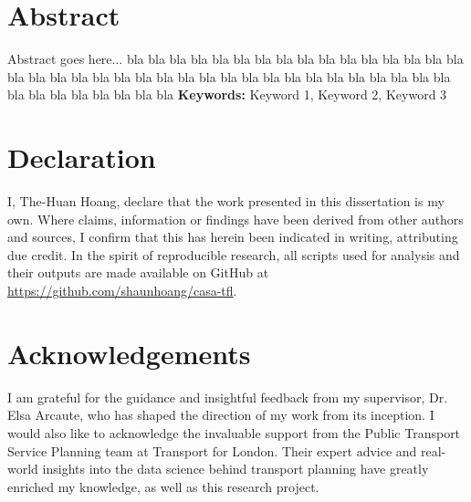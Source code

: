 \chapter*{Abstract}
Abstract goes here... bla bla bla bla bla bla bla bla bla bla bla bla bla bla bla bla bla bla bla bla bla bla bla bla bla bla bla bla bla bla bla bla bla bla bla bla bla bla bla bla bla bla bla bla bla 
\newline
\newline
\textbf{Keywords:} Keyword 1, Keyword 2, Keyword 3

\chapter*{Declaration}
I, The-Huan Hoang, declare that the work presented in this dissertation is my own. Where claims, information or findings have been derived from other authors and sources, I confirm that this has herein been indicated in writing, attributing due credit. In the spirit of reproducible research, all scripts used for analysis and their outputs are made available on GitHub at \url{https://github.com/shaunhoang/casa-tfl}. 

\chapter*{Acknowledgements}
I am grateful for the guidance and insightful feedback from my supervisor, Dr. Elsa Arcaute, who has shaped the direction of my work from its inception. I would also like to acknowledge the invaluable support from the Public Transport Service Planning team at Transport for London. Their expert advice and real-world insights into the data science behind transport planning have greatly enriched my knowledge, as well as this research project.

\tableofcontents

\listoffigures

\listoftables